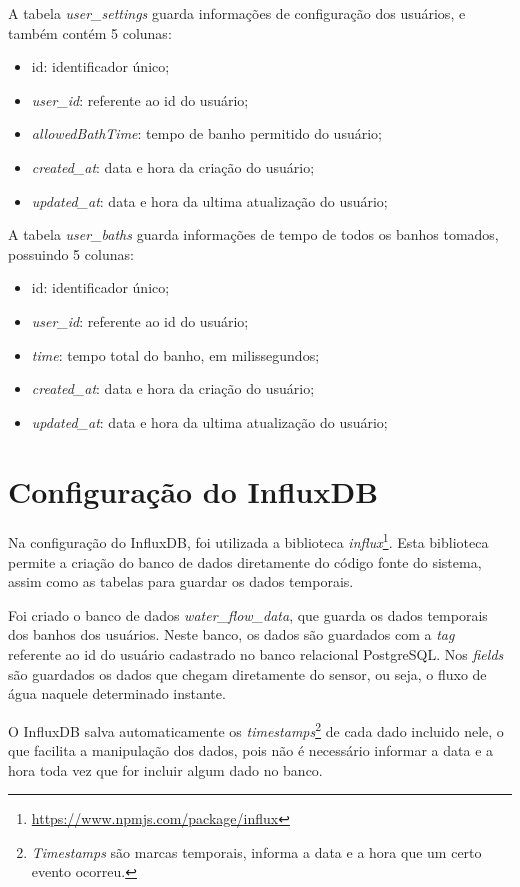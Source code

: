 A tabela \textit{user\_settings} guarda informações de configuração dos usuários, e também contém 5 colunas:

\begin{itemize}
	\item id: identificador único;
	\item \textit{user\_id}: referente ao id do usuário;
	\item \textit{allowedBathTime}: tempo de banho permitido do usuário;
	\item \textit{created\_at}: data e hora da criação do usuário;
	\item \textit{updated\_at}: data e hora da ultima atualização do usuário;
\end{itemize}

A tabela \textit{user\_baths} guarda informações de tempo de todos os banhos tomados, possuindo 5 colunas:

\begin{itemize}
	\item id: identificador único;
	\item \textit{user\_id}: referente ao id do usuário;
	\item \textit{time}: tempo total do banho, em milissegundos;
	\item \textit{created\_at}: data e hora da criação do usuário;
	\item \textit{updated\_at}: data e hora da ultima atualização do usuário;
\end{itemize}

\section{Configuração do InfluxDB}

Na configuração do InfluxDB, foi utilizada a biblioteca \textit{influx}\footnote{\url{https://www.npmjs.com/package/influx}}. Esta biblioteca permite a criação do banco de dados diretamente do código fonte do sistema, assim como as tabelas para guardar os dados temporais.

Foi criado o banco de dados \textit{water\_flow\_data}, que guarda os dados temporais dos banhos dos usuários. Neste banco, os dados são guardados com a \textit{tag} referente ao id do usuário cadastrado no banco relacional PostgreSQL. Nos \textit{fields} são guardados os dados que chegam diretamente do sensor, ou seja, o fluxo de água naquele determinado instante.

O InfluxDB salva automaticamente os \textit{timestamps}\footnote{\textit{Timestamps} são marcas temporais, informa a data e a hora que um certo evento ocorreu.} de cada dado incluido nele, o que facilita a manipulação dos dados, pois não é necessário informar a data e a hora toda vez que for incluir algum dado no banco.

